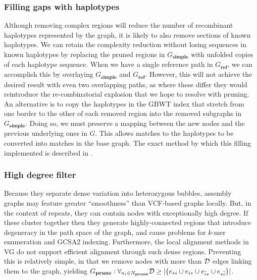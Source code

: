 \subsubsection{Filling gaps with haplotypes}

Although removing complex regions will reduce the number of recombinant haplotypes represented by the graph, it is likely to also remove sections of known haplotypes.
We can retain the complexity reduction without losing sequences in known haplotypes by replacing the pruned regions in $G_\textbf{simple}$ with unfolded copies of each haplotype sequence.
When we have a single reference path in $G_\textbf{ref}$, we can accomplish this by overlaying $G_\textbf{simple}$ and $G_\textbf{ref}$.
However, this will not achieve the desired result with even two overlapping paths, as where these differ they would reintroduce the re-combinatorial explosion that we hope to resolve with pruning.
An alternative is to copy the haplotypes in the GBWT index that stretch from one border to the other of each removed region into the removed subgraphs in $G_\textbf{simple}$.
Doing so, we must preserve a mapping between the new nodes and the previous underlying ones in $G$.
This allows matches to the haplotypes to be converted into matches in the base graph.
The exact method by which this filling implemented is described in \cite{siren2018haplotype}.

\subsubsection{High degree filter}

Because they separate dense variation into heterozygous bubbles, assembly graphs may feature greater ``smoothness'' than VCF-based graphs locally.
But, in the context of repeats, they can contain nodes with exceptionally high degree.
If these cluster together then they generate highly-connected regions that introduce degeneracy in the path space of the graph, and cause problems for $k$-mer enumeration and GCSA2 indexing.
Furthermore, the local alignment methods in VG do not support efficient alignment through such dense regions.
Preventing this is relatively simple, in that we remove nodes with more than ${\cal D}$ edges linking them to the graph, yielding $G_\textbf{prune} : \forall_{n_i \in N_\textbf{prune}}{{\cal D} \geq |\{ e_{*i} \cup e_{i*} \cup e_{\overline{i}*} \cup e_{*\overline{i}} \}|}$.

